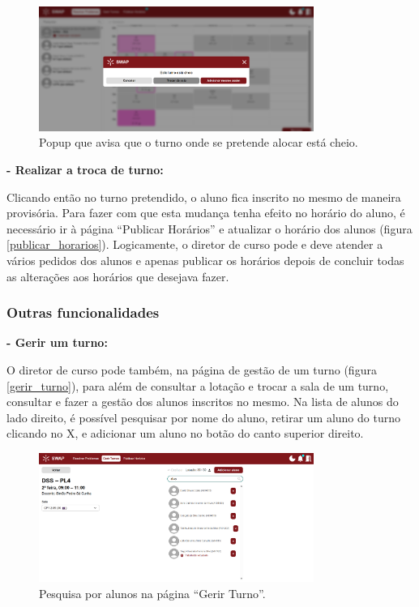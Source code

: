 \documentclass[12pt, a4paper]{article}
\begin{document}
\begin{figure}[H]
    \centering
    \includegraphics[width=0.8\textwidth]{res/manual/popup_turno_cheio.png}
    \caption{Popup que avisa que o turno onde se pretende alocar está cheio.}
    \label{popup_turno_cheio}
\end{figure}

\textbf{- Realizar a troca de turno:}

Clicando então no turno pretendido, o aluno fica inscrito no mesmo de maneira provisória. Para fazer
com que esta mudança tenha efeito no horário do aluno, é necessário ir à página
``Publicar Horários'' e atualizar o horário dos alunos (figura \ref{publicar_horarios}).
Logicamente, o diretor de curso pode e deve atender a vários pedidos dos alunos e apenas publicar os
horários depois de concluir todas as alterações aos horários que desejava fazer.

\subsubsection{Outras funcionalidades}

\textbf{- Gerir um turno:}

O diretor de curso pode também, na página de gestão de um turno (figura \ref{gerir_turno}),
para além de consultar a lotação e trocar a sala de um turno, consultar e fazer a gestão dos
alunos inscritos no mesmo. Na lista de alunos do lado direito, é possível pesquisar por nome do
aluno, retirar um aluno do turno clicando no X, e adicionar um aluno no botão do canto superior
direito.

\begin{figure}[H]
    \centering
    \includegraphics[width=0.8\textwidth]{res/manual/gerir_turno_pesquisar_alunos.png}
    \caption{Pesquisa por alunos na página ``Gerir Turno''.}
    \label{gerir_turno_pesquisar}
\end{figure}
\end{document}
